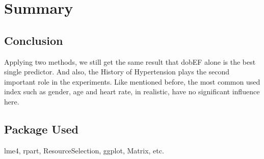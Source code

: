 \documentclass[a4paper,12pt]{article}
\begin{document}
\section{Summary}
  \subsection{Conclusion}
  Applying two methods, we still get the same result that dobEF alone is the best single predictor. And also, the History of Hypertension plays the second important role in the experiments. Like mentioned before, the most common used index such as gender, age and heart rate, in realistic, have no significant influence here.

  \subsection{Package Used}
  lme4, rpart, ResourceSelection, ggplot, Matrix, etc.
\end{document}
